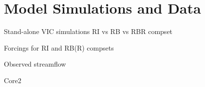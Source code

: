 \section{Model Simulations and Data}

Stand-alone VIC simulations
RI vs RB vs RBR compset
  
  
Forcings for RI and RB(R) compsets

Observed streamflow

Core2
  
  